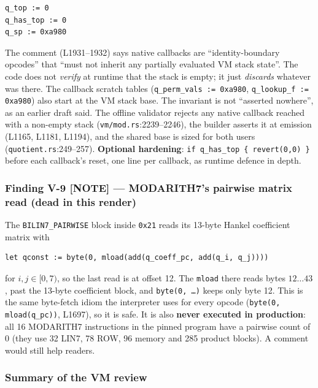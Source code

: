 \begin{lstlisting}[style=yul]
q_top := 0
q_has_top := 0
q_sp := 0xa980
\end{lstlisting}

The comment (L1931--1932) says native callbacks are
``identity-boundary opcodes'' that ``must not inherit any partially
evaluated VM stack state''. The code does not \emph{verify} at
runtime that the stack is empty; it just \emph{discards} whatever
was there. The callback scratch tables (\texttt{q\_\allowbreak{}perm\_\allowbreak{}vals :=
0xa980}, \texttt{q\_\allowbreak{}lookup\_\allowbreak{}f := 0xa980}) also start at the VM stack
base.  The invariant is not ``asserted nowhere'',
as an earlier draft said. The offline validator rejects any native
callback reached with a non-empty stack
(\texttt{vm/mod.rs}:2239--2246), the builder asserts it at emission
(L1165, L1181, L1194), and the shared base is sized for both users
(\texttt{quotient.rs}:249--257). \textbf{Optional hardening}:
\texttt{if q\_\allowbreak{}has\_\allowbreak{}top \{ revert(0,0) \}} before each callback's
reset, one line per callback, as runtime defence in depth.

\subsubsection*{Finding V-9 \textcolor{mathpurple}{[NOTE]} --- MODARITH7's pairwise matrix read (dead in this render)}

The \texttt{BILIN7\_PAIRWISE} block inside \texttt{0x21} reads its
13-byte Hankel coefficient matrix with

\begin{lstlisting}[style=yul]
let qconst := byte(0, mload(add(q_coeff_pc, add(q_i, q_j))))
\end{lstlisting}

for $i,j\in[0,7)$, so the last read is at offset 12. The
\texttt{mload} there reads bytes $12\ldots43$, past the 13-byte
coefficient block, and \texttt{byte(0, \ldots)} keeps only byte 12.
This is the same byte-fetch idiom the interpreter uses for every
opcode (\texttt{byte(0, mload(q\_\allowbreak{}pc))}, L1697), so it is safe. It
is also \textbf{never executed in production}: all 16 MODARITH7
instructions in the pinned program have a pairwise count of 0 (they
use 32 LIN7, 78 ROW, 96 memory and 285 product blocks). A comment
would still help readers.

\subsubsection*{Summary of the VM review}

